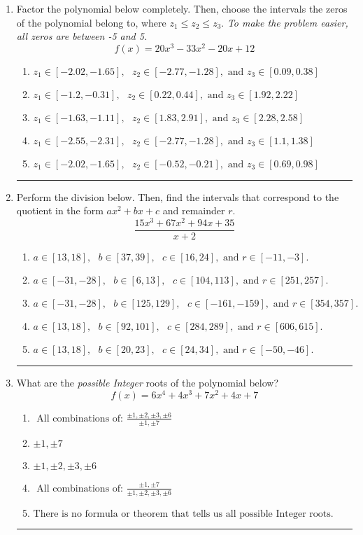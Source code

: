 \documentclass[14pt]{extbook}
\newcommand{\litem}[1]{\item#1\hspace*{-1cm}\rule{\textwidth}{0.4pt}}
\begin{document}
\begin{enumerate}
{\begin{enumerate}[label=\Alph*.]
\end{enumerate} }
\litem{
Factor the polynomial below completely. Then, choose the intervals the zeros of the polynomial belong to, where $z_1 \leq z_2 \leq z_3$. \textit{To make the problem easier, all zeros are between -5 and 5.}\[ f(x) = 20x^{3} -33 x^{2} -20 x + 12 \]\begin{enumerate}[label=\Alph*.]
\item \( z_1 \in [-2.02, -1.65], \text{   }  z_2 \in [-2.77, -1.28], \text{   and   } z_3 \in [0.09, 0.38] \)
\item \( z_1 \in [-1.2, -0.31], \text{   }  z_2 \in [0.22, 0.44], \text{   and   } z_3 \in [1.92, 2.22] \)
\item \( z_1 \in [-1.63, -1.11], \text{   }  z_2 \in [1.83, 2.91], \text{   and   } z_3 \in [2.28, 2.58] \)
\item \( z_1 \in [-2.55, -2.31], \text{   }  z_2 \in [-2.77, -1.28], \text{   and   } z_3 \in [1.1, 1.38] \)
\item \( z_1 \in [-2.02, -1.65], \text{   }  z_2 \in [-0.52, -0.21], \text{   and   } z_3 \in [0.69, 0.98] \)

\end{enumerate} }
\litem{
Perform the division below. Then, find the intervals that correspond to the quotient in the form $ax^2+bx+c$ and remainder $r$.\[ \frac{15x^{3} +67 x^{2} +94 x + 35}{x + 2} \]\begin{enumerate}[label=\Alph*.]
\item \( a \in [13, 18], \text{   } b \in [37, 39], \text{   } c \in [16, 24], \text{   and   } r \in [-11, -3]. \)
\item \( a \in [-31, -28], \text{   } b \in [6, 13], \text{   } c \in [104, 113], \text{   and   } r \in [251, 257]. \)
\item \( a \in [-31, -28], \text{   } b \in [125, 129], \text{   } c \in [-161, -159], \text{   and   } r \in [354, 357]. \)
\item \( a \in [13, 18], \text{   } b \in [92, 101], \text{   } c \in [284, 289], \text{   and   } r \in [606, 615]. \)
\item \( a \in [13, 18], \text{   } b \in [20, 23], \text{   } c \in [24, 34], \text{   and   } r \in [-50, -46]. \)

\end{enumerate} }
\litem{
What are the \textit{possible Integer} roots of the polynomial below?\[ f(x) = 6x^{4} +4 x^{3} +7 x^{2} +4 x + 7 \]\begin{enumerate}[label=\Alph*.]
\item \( \text{ All combinations of: }\frac{\pm 1,\pm 2,\pm 3,\pm 6}{\pm 1,\pm 7} \)
\item \( \pm 1,\pm 7 \)
\item \( \pm 1,\pm 2,\pm 3,\pm 6 \)
\item \( \text{ All combinations of: }\frac{\pm 1,\pm 7}{\pm 1,\pm 2,\pm 3,\pm 6} \)
\item \( \text{There is no formula or theorem that tells us all possible Integer roots.} \)


\end{enumerate}}
\end{enumerate}
\end{document}
